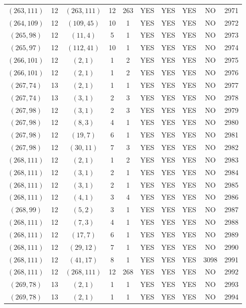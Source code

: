 \begin{longtable}{|c|c|c|c|c|c|c|c|c|c|}
$(263, 111)$ & 12 & $(263, 111)$ & 12 & 263 & YES & YES & YES & NO & 2971\\
$(264, 109)$ & 12 & $(109, 45)$ & 10 & 1 & YES & YES & YES & NO & 2972\\
$(265, 98)$ & 12 & $(11, 4)$ & 5 & 1 & YES & YES & YES & NO & 2973\\
$(265, 97)$ & 12 & $(112, 41)$ & 10 & 1 & YES & YES & YES & NO & 2974\\
$(266, 101)$ & 12 & $(2, 1)$ & 1 & 2 & YES & YES & YES & NO & 2975\\
$(266, 101)$ & 12 & $(2, 1)$ & 1 & 2 & YES & YES & YES & NO & 2976\\
$(267, 74)$ & 13 & $(2, 1)$ & 1 & 1 & YES & YES & YES & NO & 2977\\
$(267, 74)$ & 13 & $(3, 1)$ & 2 & 3 & YES & YES & YES & NO & 2978\\
$(267, 98)$ & 12 & $(3, 1)$ & 2 & 3 & YES & YES & YES & NO & 2979\\
$(267, 98)$ & 12 & $(8, 3)$ & 4 & 1 & YES & YES & YES & NO & 2980\\
$(267, 98)$ & 12 & $(19, 7)$ & 6 & 1 & YES & YES & YES & NO & 2981\\
$(267, 98)$ & 12 & $(30, 11)$ & 7 & 3 & YES & YES & YES & NO & 2982\\
$(268, 111)$ & 12 & $(2, 1)$ & 1 & 2 & YES & YES & YES & NO & 2983\\
$(268, 111)$ & 12 & $(3, 1)$ & 2 & 1 & YES & YES & YES & NO & 2984\\
$(268, 111)$ & 12 & $(3, 1)$ & 2 & 1 & YES & YES & YES & NO & 2985\\
$(268, 111)$ & 12 & $(4, 1)$ & 3 & 4 & YES & YES & YES & NO & 2986\\
$(268, 99)$ & 12 & $(5, 2)$ & 3 & 1 & YES & YES & YES & NO & 2987\\
$(268, 111)$ & 12 & $(7, 3)$ & 4 & 1 & YES & YES & YES & NO & 2988\\
$(268, 111)$ & 12 & $(17, 7)$ & 6 & 1 & YES & YES & YES & NO & 2989\\
$(268, 111)$ & 12 & $(29, 12)$ & 7 & 1 & YES & YES & YES & NO & 2990\\
$(268, 111)$ & 12 & $(41, 17)$ & 8 & 1 & YES & YES & YES & 3098 & 2991\\
$(268, 111)$ & 12 & $(268, 111)$ & 12 & 268 & YES & YES & YES & NO & 2992\\
$(269, 78)$ & 13 & $(2, 1)$ & 1 & 1 & YES & YES & YES & NO & 2993\\
$(269, 78)$ & 13 & $(2, 1)$ & 1 & 1 & YES & YES & YES & NO & 2994\\

\end{longtable}
